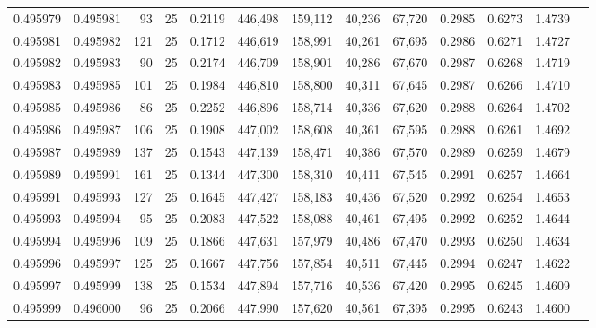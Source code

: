 \begin{tabular}{rrrrrrrrrrrrr}
0.495979 & 0.495981 &    93 &  25 &                                     0.2119 & 446,498 & 159,112 &  40,236 &  67,720 & 0.2985 & 0.6273 & 1.4739 \\
0.495981 & 0.495982 &   121 &  25 &                                     0.1712 & 446,619 & 158,991 &  40,261 &  67,695 & 0.2986 & 0.6271 & 1.4727 \\
0.495982 & 0.495983 &    90 &  25 &                                     0.2174 & 446,709 & 158,901 &  40,286 &  67,670 & 0.2987 & 0.6268 & 1.4719 \\
0.495983 & 0.495985 &   101 &  25 &                                     0.1984 & 446,810 & 158,800 &  40,311 &  67,645 & 0.2987 & 0.6266 & 1.4710 \\
0.495985 & 0.495986 &    86 &  25 &                                     0.2252 & 446,896 & 158,714 &  40,336 &  67,620 & 0.2988 & 0.6264 & 1.4702 \\
0.495986 & 0.495987 &   106 &  25 &                                     0.1908 & 447,002 & 158,608 &  40,361 &  67,595 & 0.2988 & 0.6261 & 1.4692 \\
0.495987 & 0.495989 &   137 &  25 &                                     0.1543 & 447,139 & 158,471 &  40,386 &  67,570 & 0.2989 & 0.6259 & 1.4679 \\
0.495989 & 0.495991 &   161 &  25 &                                     0.1344 & 447,300 & 158,310 &  40,411 &  67,545 & 0.2991 & 0.6257 & 1.4664 \\
0.495991 & 0.495993 &   127 &  25 &                                     0.1645 & 447,427 & 158,183 &  40,436 &  67,520 & 0.2992 & 0.6254 & 1.4653 \\
0.495993 & 0.495994 &    95 &  25 &                                     0.2083 & 447,522 & 158,088 &  40,461 &  67,495 & 0.2992 & 0.6252 & 1.4644 \\
0.495994 & 0.495996 &   109 &  25 &                                     0.1866 & 447,631 & 157,979 &  40,486 &  67,470 & 0.2993 & 0.6250 & 1.4634 \\
0.495996 & 0.495997 &   125 &  25 &                                     0.1667 & 447,756 & 157,854 &  40,511 &  67,445 & 0.2994 & 0.6247 & 1.4622 \\
0.495997 & 0.495999 &   138 &  25 &                                     0.1534 & 447,894 & 157,716 &  40,536 &  67,420 & 0.2995 & 0.6245 & 1.4609 \\
0.495999 & 0.496000 &    96 &  25 &                                     0.2066 & 447,990 & 157,620 &  40,561 &  67,395 & 0.2995 & 0.6243 & 1.4600 \\

\end{tabular}
